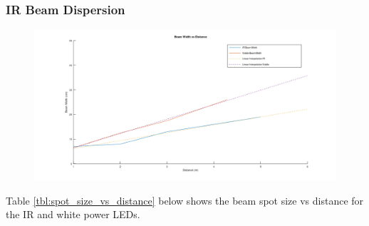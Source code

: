 \subsubsection{IR Beam Dispersion}

\begin{figure}[H]
	\centering
	\includegraphics[width=\linewidth]{figures/results/beam_width_vs_distance.png}
	\label{fig:beam_width_vs_distance}
\end{figure}



Table \ref{tbl:spot_size_vs_distance} below shows the beam spot size vs distance for the IR and white power LEDs.

